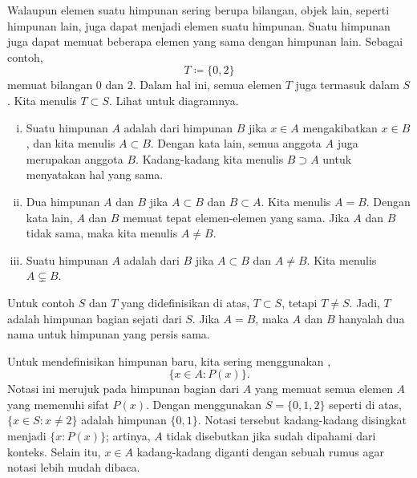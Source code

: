 Walaupun elemen suatu himpunan sering berupa bilangan,
objek lain, seperti himpunan lain, juga dapat menjadi elemen suatu himpunan.
Suatu himpunan juga dapat memuat beberapa elemen yang sama dengan himpunan
lain.  Sebagai contoh,
\begin{equation*}
T \coloneqq \{ 0, 2 \}
\end{equation*}
memuat bilangan 0 dan 2.  Dalam hal ini, semua elemen $T$ juga
termasuk dalam $S$.  Kita menulis $T \subset S$.
Lihat  untuk diagramnya.

\begin{myfigureht}
\caption{Diagram himpunan contoh $S$ dan himpunan bagiannya $T$.\label{fig:sets}}
\end{myfigureht}

\begin{defn}
\pagebreak[2]
\leavevmode
\begin{enumerate}[(i)]
\item
Suatu himpunan $A$ adalah \emph{}
dari himpunan $B$ jika $x \in A$ mengakibatkan $x \in B$, dan kita menulis
$A \subset B$.
Dengan kata lain, semua anggota $A$ juga merupakan anggota $B$.  Kadang-kadang
kita menulis $B \supset A$ untuk menyatakan hal yang sama.
\item
Dua himpunan $A$ dan $B$ \emph{} jika
$A \subset B$ dan $B \subset A$.  Kita menulis $A = B$.
Dengan kata lain, $A$ dan $B$ memuat tepat elemen-elemen yang sama.
Jika $A$ dan $B$ tidak sama, maka
kita menulis $A \neq B$.
\item
Suatu himpunan $A$ adalah \emph{} dari $B$ jika
$A \subset B$ dan $A \neq B$.  Kita menulis
$A \subsetneq B$.
\end{enumerate}
\end{defn}

Untuk contoh $S$ dan $T$ yang didefinisikan di atas, $T \subset S$, tetapi
$T \neq S$.  Jadi, $T$ adalah himpunan bagian sejati dari $S$.
Jika $A = B$, maka $A$ dan $B$ hanyalah dua nama untuk
himpunan yang persis sama.

Untuk mendefinisikan himpunan baru, kita sering menggunakan
\emph{},
\begin{equation*}
\bigl\{ x \in A : P(x) \bigr\} .
\end{equation*}
Notasi ini merujuk pada himpunan bagian dari $A$ yang memuat semua elemen
$A$ yang memenuhi sifat $P(x)$.
Dengan menggunakan $S = \{ 0, 1, 2 \}$ seperti di atas,
$\{ x \in S : x \neq 2 \}$ adalah himpunan $\{ 0, 1 \}$.
Notasi tersebut kadang-kadang
disingkat menjadi $\bigl\{ x : P(x) \bigr\}$; artinya, $A$ tidak disebutkan
jika sudah dipahami dari konteks.
Selain itu, $x \in A$ kadang-kadang diganti dengan sebuah rumus agar notasi
lebih mudah dibaca.


